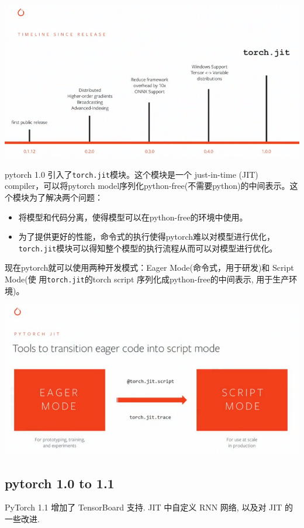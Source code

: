 \includegraphics[width=0.8\linewidth]{pytorch/pic/road_to_pytorch_1_0.png}

pytorch 1.0 引入了\texttt{torch.jit}模块。这个模块是一个 just-in-time (JIT) compiler，可以将pytorch model序列化python-free(不需要python)的中间表示。这个模块为了解决两个问题：
\begin{itemize}
  \tightlist
  \item
    将模型和代码分离，使得模型可以在python-free的环境中使用。
  \item
    为了提供更好的性能，命令式的执行使得pytorch难以对模型进行优化，\texttt{torch.jit}模块可以得知整个模型的执行流程从而可以对模型进行优化。
\end{itemize}

现在pytorch就可以使用两种开发模式：Eager Mode(命令式，用于研发)和 Script Mode(使
用\texttt{torch.jit}的torch script 序列化成python-free的中间表示, 用于生产环
境)。

\includegraphics[width=0.8\linewidth]{pytorch/pic/pytorch_mode.png}

\subsection{pytorch 1.0 to 1.1}

PyTorch 1.1 增加了 TensorBoard  支持. JIT 中自定义 RNN 网络, 以及对 JIT 的一些改进.

